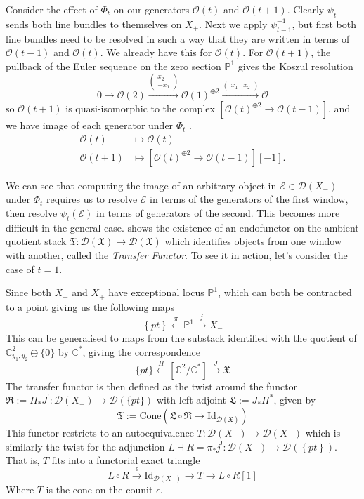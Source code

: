 Consider the effect of $\Phi_t$ on our generators $\mathcal{O}(t)$ and $\mathcal{O}(t+1)$. Clearly $\psi_t$ sends both line bundles to themselves on $X_{+}$. Next we apply $\psi_{t-1}^{-1}$, but first both line bundles need to be resolved in such a way that they are written in terms of $\mathcal{O}(t-1)$ and $\mathcal{O}(t)$. We already have this for $\mathcal{O}(t)$. For $\mathcal{O}(t+1)$, the pullback of the Euler sequence on the zero section $\mathbb{P}^1$ gives the Koszul resolution $$
 0\to \mathcal{O}(2)\xrightarrow{\begin{pmatrix}x_2\\-x_{1}\end{pmatrix}}\mathcal{O}(1)^{\oplus 2}\xrightarrow{\begin{pmatrix}x_{1}&x_2\end{pmatrix}} \mathcal{O}
$$so $\mathcal{O}(t+1)$ is quasi-isomorphic to the complex $\left[ \mathcal{O}(t)^{\oplus{2}}\to \mathcal{O}(t-1) \right]$, and we have image of each generator under $\Phi_t$ . 
\begin{align*}
\mathcal{O}(t) &\mapsto \mathcal{O}(t)\\
\mathcal{\mathcal{O}}(t+1)&\mapsto\left[ \mathcal{O}(t)^{\oplus 2}\to \mathcal{O}(t-1) \right][-1] .
\end{align*}

We can see that computing the image of an arbitrary object in $\mathcal{E} \in \mathcal{D}(X_-)$ under $\Phi_t$ requires us to resolve $\mathcal{E}$ in terms of the generators of the first window, then resolve $\psi_{t}(\mathcal{E})$ in terms of generators of the second. This becomes more difficult in the general case.  \cite{donovan_window_2014} shows the existence of an endofunctor on the ambient quotient stack $\mathfrak{T}: \mathcal{D}(\mathfrak{X})\to \mathcal{D}(\mathfrak{X})$ which identifies objects from one window with another, called the \emph{Transfer Functor}. To see it in action, let's consider the case of $t = 1$.

Since both $X_-$ and $X_+$ have exceptional locus $\mathbb{P}^1$, which can both be contracted to a point giving us the following maps $$
\left\{ pt \right\} \xleftarrow{\pi} \mathbb{P}^{1}\xrightarrow{j} X_{-}
$$
This can be generalised to maps from the substack identified with the quotient of $\mathbb{C}^{2}_{y_{1}, y_{2}} \oplus \{ 0 \}$ by $\mathbb{C}^*$, giving the correspondence $$
\{ pt \}\xleftarrow{\Pi}[\mathbb{C}^{2}/\mathbb{C}^*] \xrightarrow{J} \mathfrak{X}
$$
The transfer functor is then defined as the twist around the functor $\mathfrak{R}:= \Pi_{*}J^{!}: \mathcal{D}(X_{-})\to \mathcal{D}(\{ pt \})$  with left adjoint $\mathfrak{L}:= J_{*}\Pi^{*}$, given by $$
\mathfrak{T}:= \mathrm{Cone}\left(\mathfrak{L}\circ \mathfrak{R} \to \mathrm{Id}_{\mathcal{D}(\mathfrak{X})} \right) 
$$
This functor restricts to an autoequivalence $T: \mathcal{D}(X_{-})\to \mathcal{D}(X_-)$ which is similarly the twist for the adjunction $L\dashv R= \pi_{*}j^{!} : \mathcal{D}(X_{-})\to \mathcal{D}(\left\{ pt \right\})$. That is, $T$ fits into a functorial exact triangle $$
L\circ R \xrightarrow{\epsilon} \mathrm{Id}_{\mathcal{D}(X_{-})} \to T\to L\circ R[1]
$$Where $T$ is the cone on the counit $\epsilon$. 


